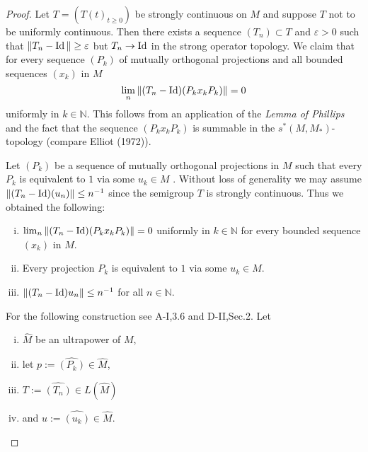\begin{proof}
Let $T = (T(t)_{t \geq 0})$ be strongly continuous on $M$ and suppose $T$ not to be uniformly continuous.
Then there exists a sequence $(T_n) \subset T$ and $\varepsilon > 0$ such that $\|T_n - \operatorname{Id}\| \geq \varepsilon$ but $T_n \to \operatorname{Id}$ in the strong operator topology.
We claim that for every sequence $(P_k)$ of mutually orthogonal projections and all bounded sequences $(x_k)$ in $M$
\[
\lim_n \|(T_n - \operatorname{Id})(P_k x_k P_k)\| = 0
\]
uniformly in $k \in \mathbb{N}$.
This follows from an application of the \emph{Lemma of Phillips} and the fact that the sequence $(P_{k} x_{k} P_{k})$ is summable in the $s^{*}(M,M_*)$-topology (compare Elliot (1972)).

Let $(P_k)$ be a sequence of mutually orthogonal projections in $M$ such that every $P_k$ is equivalent to $1$ via some $u_k \in M$ \cite[2.2]{sakai:1971}.
Without loss of generality we may assume $\|(T_n - \operatorname{Id})(u_n)\| \leq n^{-1}$ since the semigroup $T$ is strongly continuous.
Thus we obtained the following:
\begin{enumerate}[(i)]
\item 
$\lim_n \|(T_n - \operatorname{Id})(P_k x_k P_k)\| = 0$ uniformly in $k \in \mathbb{N}$ for every bounded sequence $(x_k)$ in $M$.
\item 
Every projection $P_k$ is equivalent to $1$ via some $u_k \in M$.
\item 
$\|(T_n - \operatorname{Id})u_n\| \leq n^{-1}$ for all $n \in \mathbb{N}$.
\end{enumerate}
For the following construction see A-I,3.6 and D-II,Sec.2.
Let 
\begin{enumerate}[(i)]
\item
$\widehat{M}$ be an ultrapower of $M$,

\item
let $p := \widehat{(P_{k})} \in \widehat{M}$,

\item
$T := \widehat{(T_{n}) }\in L(\widehat{M})$

\item
 and $u := \widehat{(u_{k})}  \in \widehat{M}$.


\end{enumerate}
\end{proof}
